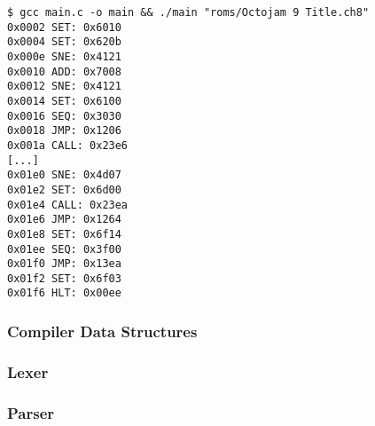 \begin{lstlisting}
$ gcc main.c -o main && ./main "roms/Octojam 9 Title.ch8"
0x0002 SET: 0x6010
0x0004 SET: 0x620b
0x000e SNE: 0x4121
0x0010 ADD: 0x7008
0x0012 SNE: 0x4121
0x0014 SET: 0x6100
0x0016 SEQ: 0x3030
0x0018 JMP: 0x1206
0x001a CALL: 0x23e6
[...]
0x01e0 SNE: 0x4d07
0x01e2 SET: 0x6d00
0x01e4 CALL: 0x23ea
0x01e6 JMP: 0x1264
0x01e8 SET: 0x6f14
0x01ee SEQ: 0x3f00
0x01f0 JMP: 0x13ea
0x01f2 SET: 0x6f03
0x01f6 HLT: 0x00ee
\end{lstlisting}

\subsubsection{Compiler Data Structures}
\subsubsection{Lexer}
\subsubsection{Parser}